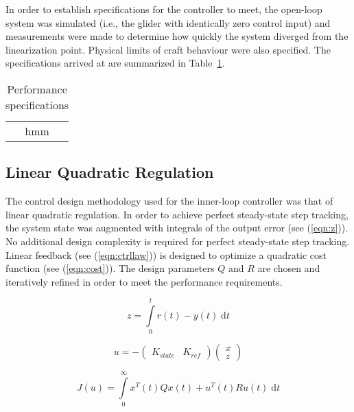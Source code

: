 \documentclass{sydeStyle}
\begin{document}
In order to establish specifications for the controller to meet, the open-loop
system was simulated (i.e., the glider with identically zero control input) and
measurements were made to determine how quickly the system diverged from the
linearization point.  Physical limits of craft behaviour were also specified.
The specifications arrived at are summarized in Table~\ref{tab:specs}.

\begin{table}[b]
    \centering
    \begin{tabular}{|c|}
        hmm
    \end{tabular}
    \caption{Performance specifications}
    \label{tab:specs}
\end{table}

\subsection{Linear Quadratic Regulation}
The control design methodology used for the inner-loop controller was that of
linear quadratic regulation.  In order to achieve perfect steady-state step
tracking, the system state was augmented with integrals of the output error (see
(\ref{eqn:z})).  No additional design complexity is required for perfect
steady-state step tracking.  Linear feedback (see (\ref{eqn:ctrllaw})) is
designed to optimize a quadratic cost function (see (\ref{eqn:cost})).  The
design parameters $Q$ and $R$ are chosen and iteratively refined in order to
meet the performance requirements.

\begin{equation}
    z = \int\limits_0^t r(t) - y(t) \; \textrm{d}t
    \label{eqn:z}
\end{equation}

\begin{equation}
    u
    =
    -
    \begin{pmatrix}
        K_{state} & K_{ref}
    \end{pmatrix}
    \begin{pmatrix}
        x \\ z
    \end{pmatrix}
    \label{eqn:ctrllaw}
\end{equation}

\begin{equation}
    J(u) = \int\limits_0^\infty x^T(t)Qx(t) + u^T(t)Ru(t) \; \textrm{d}t
    \label{eqn:cost}
\end{equation}
\end{document}
